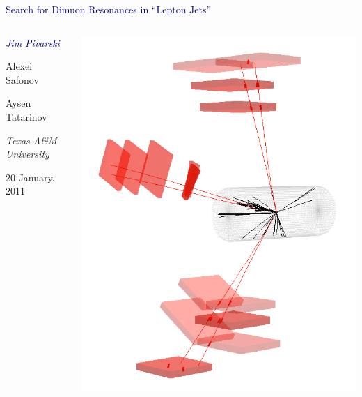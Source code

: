 \documentclass[compress]{beamer}
\begin{document}
\begin{frame}
\vfill
\begin{center}
\textcolor{darkblue}{\Large Search for Dimuon Resonances in ``Lepton Jets''}

\vfill
\begin{columns}
\begin{center}
\large
\textcolor{darkblue}{\it Jim Pivarski}

Alexei Safonov

Aysen Tatarinov

\vspace{0.5 cm}
\scriptsize
{\it Texas A\&M University}

\vspace{0.5 cm}
\normalsize
20 January, 2011
\end{center}

\includegraphics[width=\linewidth]{eventdisplay_3d.png}
\end{columns}

\end{center}
\end{frame}
\end{document}
